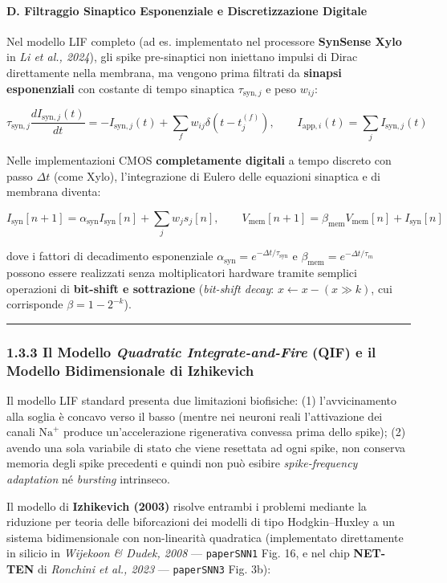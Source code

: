 \documentclass[11pt,a4paper]{article}
\begin{document}
\paragraph{D. Filtraggio Sinaptico Esponenziale e Discretizzazione Digitale}
Nel modello LIF completo (ad es. implementato nel processore \textbf{SynSense Xylo} in \textit{Li et al., 2024}), gli spike pre-sinaptici non iniettano impulsi di Dirac direttamente nella membrana, ma vengono prima filtrati da \textbf{sinapsi esponenziali} con costante di tempo sinaptica $\tau_{\text{syn},j}$ e peso $w_{ij}$:

\[
\tau_{\text{syn},j} \frac{dI_{\text{syn},j}(t)}{dt} = -I_{\text{syn},j}(t) + \sum_{f} w_{ij} \delta\left(t - t_j^{(f)}\right), \qquad I_{\text{app},i}(t) = \sum_{j} I_{\text{syn},j}(t)
\]

Nelle implementazioni CMOS \textbf{completamente digitali} a tempo discreto con passo $\Delta t$ (come Xylo), l'integrazione di Eulero delle equazioni sinaptica e di membrana diventa:

\[
I_{\text{syn}}[n+1] = \alpha_{\text{syn}} I_{\text{syn}}[n] + \sum_{j} w_j s_j[n], \qquad V_{\text{mem}}[n+1] = \beta_{\text{mem}} V_{\text{mem}}[n] + I_{\text{syn}}[n]
\]

dove i fattori di decadimento esponenziale $\alpha_{\text{syn}} = e^{-\Delta t / \tau_{\text{syn}}}$ e $\beta_{\text{mem}} = e^{-\Delta t / \tau_m}$ possono essere realizzati senza moltiplicatori hardware tramite semplici operazioni di \textbf{bit-shift e sottrazione} (\textit{bit-shift decay}: $x \leftarrow x - (x \gg k)$, cui corrisponde $\beta = 1 - 2^{-k}$).

\bigskip\hrule\bigskip

\subsubsection{1.3.3 Il Modello \textit{Quadratic Integrate-and-Fire} (QIF) e il Modello Bidimensionale di Izhikevich}

Il modello LIF standard presenta due limitazioni biofisiche: (1) l'avvicinamento alla soglia è concavo verso il basso (mentre nei neuroni reali l'attivazione dei canali $\text{Na}^+$ produce un'accelerazione rigenerativa convessa prima dello spike); (2) avendo una sola variabile di stato che viene resettata ad ogni spike, non conserva memoria degli spike precedenti e quindi non può esibire \textit{spike-frequency adaptation} né \textit{bursting} intrinseco.

Il modello di \textbf{Izhikevich (2003)} risolve entrambi i problemi mediante la riduzione per teoria delle biforcazioni dei modelli di tipo Hodgkin--Huxley a un sistema bidimensionale con non-linearità quadratica (implementato direttamente in silicio in \textit{Wijekoon \& Dudek, 2008} --- \texttt{paperSNN1} Fig. 16, e nel chip \textbf{NET-TEN} di \textit{Ronchini et al., 2023} --- \texttt{paperSNN3} Fig. 3b):
\end{document}
